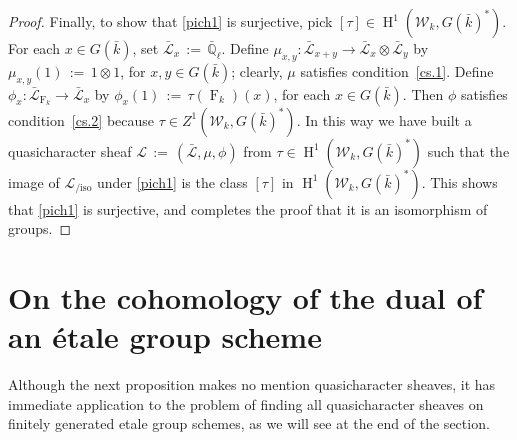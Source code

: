\documentclass[11pt]{amsart}
\theoremstyle{plain}
\theoremstyle{definition}
\theoremstyle{remark}
\newcommand{\EE}{\mathbb{\bar Q}_\ell}
\newcommand{\bFq}{\bar{k}}
\newcommand{\Fq}{k}
\newcommand{\Frob}[1]{\operatorname{F}_{#1}}
\DeclareMathOperator{\Hh}{H}
\newcommand{\ceq}{{\, :=\, }}
\newcommand{\qcs}[1]{{\mathcal{#1}}}
\newcommand{\gqcs}[1]{{\mathcal{\bar #1}}}
\newcommand{\Weil}[1]{\mathcal{W}_{#1}}
\begin{document}
\begin{proof}
 Finally, to show that \eqref{pich1} is surjective, pick $[\tau]\in \Hh^1(\Weil{\Fq}, G(\bFq)^*)$.
 For each $x\in G(\bFq)$, set $\gqcs{L}_x \ceq \EE$.
 Define $\mu_{x,y} : \gqcs{L}_{x+y} \to \gqcs{L}_x\otimes \gqcs{L}_y$ by
 $\mu_{x,y}(1) \ceq 1\otimes1$, for $x,y\in G(\bFq)$; 
 clearly, $\mu$ satisfies condition~\ref{cs.1}.
 Define $\phi_x : \gqcs{L}_{\Frob{\Fq}} \to \gqcs{L}_x$ by $\phi_x(1) \ceq \tau(\Frob{\Fq})(x)$,
 for each $x\in G(\bFq)$. 
 Then $\phi$ satisfies condition~\ref{cs.2} because $\tau \in Z^1(\Weil{\Fq},G(\bFq)^*)$.
 In this way we have built a quasicharacter sheaf $\qcs{L} \ceq (\gqcs{L},\mu,\phi)$ 
 from $\tau \in \Hh^1(\Weil{\Fq}, G(\bFq)^*)$ such that the image of $\qcs{L}_{/\text{iso}}$
 under \eqref{pich1} is the class $[\tau]$ in $\Hh^1(\Weil{\Fq}, G(\bFq)^*)$.
 This shows that \eqref{pich1} is surjective, 
 and completes the proof that it is an isomorphism of groups.
\end{proof}

\section{On the cohomology of the dual of an \'etale group scheme} \label{sec:etalecohom}

Although the next proposition makes no mention quasicharacter sheaves, 
it has immediate application to the problem of finding all quasicharacter sheaves
on finitely generated etale group schemes, as we will see at the end of the section.
\end{document}
